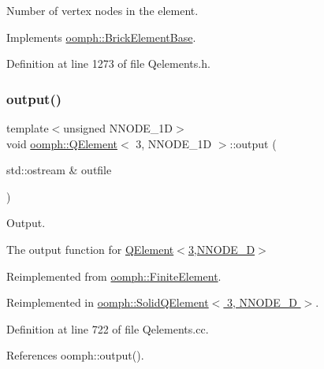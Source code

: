 Number of vertex nodes in the element. 



Implements \hyperlink{classoomph_1_1BrickElementBase_a8a2f954fea0650a9641c69614929cfa7}{oomph\+::\+Brick\+Element\+Base}.



Definition at line 1273 of file Qelements.\+h.

\mbox{\label{classoomph_1_1QElement_3_013_00_01NNODE__1D_01_4_a9859c393a3b4b4808f315cb1baf8dde4}} 
\subsubsection{\texorpdfstring{output()}{output()}\hspace{0.1cm}{\footnotesize\ttfamily [1/4]}}
{\footnotesize\ttfamily template$<$unsigned N\+N\+O\+D\+E\+\_\+1D$>$ \\
void \hyperlink{classoomph_1_1QElement}{oomph\+::\+Q\+Element}$<$ 3, N\+N\+O\+D\+E\+\_\+1D $>$\+::output (\begin{DoxyParamCaption}\item[{std\+::ostream \&}]{outfile }\end{DoxyParamCaption})\hspace{0.3cm}{\ttfamily [virtual]}}



Output. 

The output function for \hyperlink{classoomph_1_1QElement_3_013_00_01NNODE__1D_01_4}{Q\+Element$<$3,\+N\+N\+O\+D\+E\+\_\+D$>$} 

Reimplemented from \hyperlink{classoomph_1_1FiniteElement_a2ad98a3d2ef4999f1bef62c0ff13f2a7}{oomph\+::\+Finite\+Element}.



Reimplemented in \hyperlink{classoomph_1_1SolidQElement_3_013_00_01NNODE__1D_01_4_a50bd6f3e7c5801a12428198b91e1ef01}{oomph\+::\+Solid\+Q\+Element$<$ 3, N\+N\+O\+D\+E\+\_\+D $>$}.



Definition at line 722 of file Qelements.\+cc.



References oomph\+::output().

